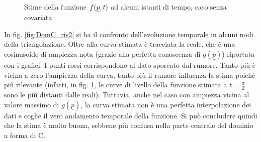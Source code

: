\documentclass[a4paper,11pt,twoside,openright]{book}							%
\begin{document}
\begin{figure}[H]
{   }
	\caption{Stime della funzione $f(\protect\underline{p},t)$ ad alcuni istanti di tempo, caso senza covariata}
	\label{fig:DomC_ris}
\end{figure}

In fig. \ref{fig:DomC_ris2} si ha il confronto dell'evoluzione temporale in alcuni nodi della triangolazione. Oltre alla curva stimata è tracciata la reale, che è una cosinusoide di ampiezza nota (grazie alla perfetta conoscenza di $g(\underline p)$) riportata con i grafici. I punti rossi corrispondono al dato sporcato dal rumore. Tanto più è vicina a zero l'ampiezza della curva, tanto più il rumore influenza la stima poichè più rilevante (infatti, in fig. \ref{fig:DomC_ris}, le curve di livello della funzione stimata a $t=\frac{\pi}{2}$ sono le più distanti dalle reali). Tuttavia, anche nel caso con ampiezza vicina al valore massimo di $g(\underline p)$, la curva stimata non è una perfetta interpolazione dei dati e coglie il vero andamento temporale della funzione. Si può concludere quindi che la stima è molto buona, sebbene più confusa nella parte centrale del dominio a forma di C.
\end{document}
